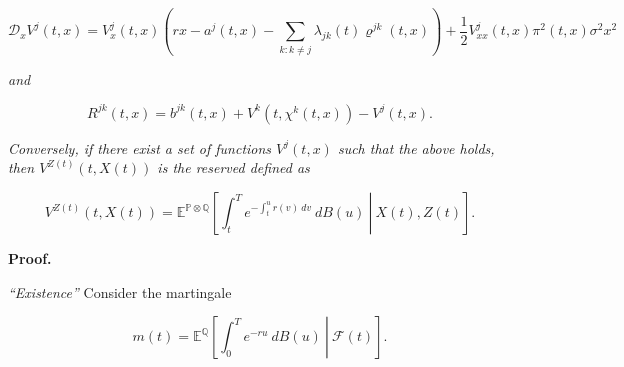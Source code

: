 \documentclass[a4paper,10pt,openany]{book}
\begin{document}
\[
\mathcal D_xV^j(t,x)=V_x^j(t,x)\left(rx-a^j(t,x)-\sum_{k:k\ne j}\lambda_{jk}(t)\varrho^{jk}(t,x)\right)+\frac{1}{2}V^j_{xx}(t,x)\pi^2(t,x)\sigma^2x^2
\]

\emph{and}

\[
R^{jk}(t,x)=b^{jk}(t,x)+V^k(t,\chi^k(t,x))-V^j(t,x).
\]

\emph{Conversely, if there exist a set of functions \(V^j(t,x)\) such that the above holds, then \(V^{Z(t)}(t,X(t))\) is the reserved defined as}

\[
V^{Z(t)}(t,X(t))=\mathbb E^{\mathbb P\otimes\mathbb Q}\left[\left. \int_t^Te^{-\int_t^u r(v)\ dv}\ dB(u)\ \right\vert\ X(t),Z(t)\right].
\]

\textbf{Proof.}

\emph{``Existence''} Consider the martingale

\[
m(t)=\mathbb E^{\mathbb Q}\left[\left. \int_0^Te^{-ru}\ dB(u)\ \right\vert\ \mathcal F(t)\right].
\]
\end{document}

